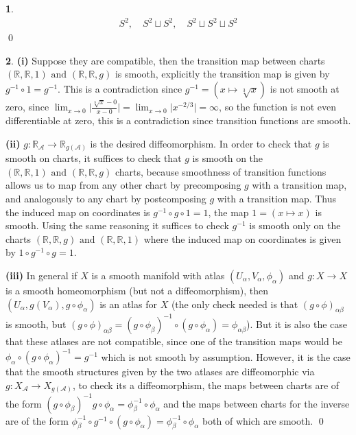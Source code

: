\documentclass[10.5pt]{article}
\theoremstyle{definition}
\newtheorem{pb}{}
\newcommand{\abs}[1]{\lvert#1\rvert}
\newcommand{\tand}{\text{ and }}
\begin{document}
    \begin{pb}
        \begin{align*}
            S^2, \quad S^2 \sqcup S^2, \quad S^2 \sqcup S^2 \sqcup S^2
        \end{align*} \qed
    \end{pb}
    \begin{pb}
        \textbf{(i)} Suppose they are compatible, then the transition map between charts \((\mathbb{R},\mathbb{R},1) \tand (\mathbb{R},\mathbb{R},g)\) is smooth, explicitly the transition map is given by \(g^{-1}\circ1 = g^{-1}\). This is a contradiction since \(g^{-1} = (x \mapsto \sqrt[3]{x})\) is not smooth at zero, since \(\lim_{x \to 0}\abs{\frac{\sqrt[3]{x} - 0}{x - 0}} = \lim_{x\to0}\abs{x^{-2/3}} = \infty\), so the function is not even differentiable at zero, this is a contradiction since transition functions are smooth.

        \textbf{(ii)} \(g: \mathbb{R}_\mathcal{A} \to \mathbb{R}_{g(\mathcal{A})}\) is the desired diffeomorphism. In order to check that \(g\) is smooth on charts, it suffices to check that \(g\) is smooth on the \((\mathbb{R},\mathbb{R},1) \tand (\mathbb{R},\mathbb{R},g)\) charts, because smoothness of transition functions allows us to map from any other chart by precomposing \(g\) with a transition map, and analogously to any chart by postcomposing \(g\) with a transition map. Thus the induced map on coordinates is \(g^{-1}\circ g\circ1 = 1\), the map \(1 = (x \mapsto x)\) is smooth. Using the same reasoning it suffices to check \(g^{-1}\) is smooth only on the charts \((\mathbb{R},\mathbb{R},g) \tand (\mathbb{R},\mathbb{R},1)\) where the induced map on coordinates is given by \(1\circ g^{-1}\circ g = 1\).

        \textbf{(iii)} In general if \(X\) is a smooth manifold with atlas \((U_\alpha,V_\alpha,\phi_\alpha)\) and \(g: X \to X\) is a smooth homeomorphism (but not a diffeomorphism), then \((U_\alpha,g(V_\alpha),g\circ\phi_\alpha)\) is an atlas for \(X\) (the only check needed is that \((g\circ\phi)_{\alpha \beta}\) is smooth, but \((g\circ\phi)_{\alpha \beta} = (g\circ\phi_\beta)^{-1}\circ(g\circ\phi_\alpha) = \phi_{\alpha \beta}\)). But it is also the case that these atlases are not compatible, since one of the transition maps would be \(\phi_\alpha\circ (g\circ\phi_\alpha)^{-1} = g^{-1}\) which is not smooth by assumption. However, it is the case that the smooth structures given by the two atlases are diffeomorphic via \(g: X_\mathcal{A} \to X_{g(\mathcal{A})}\), to check its a diffeomorphism, the maps between charts are of the form \((g\circ\phi_\beta)^{-1}g\circ\phi_\alpha = \phi_\beta^{-1}\circ\phi_\alpha\) and the maps between charts for the inverse are of the form \(\phi_\beta^{-1} \circ g^{-1}\circ(g\circ\phi_\alpha) = \phi_\beta^{-1}\circ\phi_\alpha\) both of which are smooth. \qed
    \end{pb}
\end{document}
